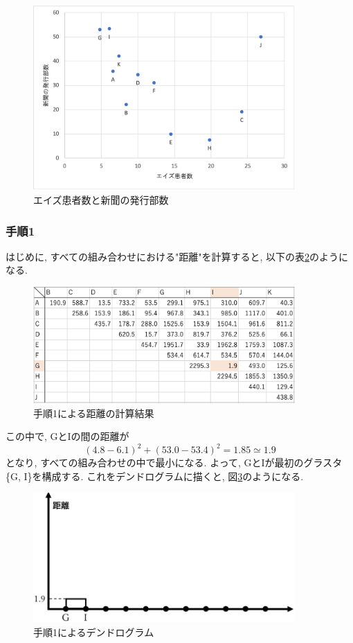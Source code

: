 \documentclass[a4paper,11pt,dvipdfmx]{jsarticle}
\makeatletter
\newcommand{\tblcaption}[1]{\def\@captype{table}\caption{#1}}
\makeatother
\begin{document}
\begin{figure}[htb]
  \centering
  \includegraphics[width=10cm]{../pics/aids.png}
  \caption{エイズ患者数と新聞の発行部数}
  \label{fig:aids_and_circulation}
\end{figure}

\subsubsection*{手順1}
はじめに, すべての組み合わせにおける"距離"を計算すると, 以下の表\ref{tab:initial_distance}のようになる. 

\begin{figure}[htb]
  \centering
  \tblcaption{手順1による距離の計算結果}
  \label{tab:initial_distance}
  \includegraphics[width=10cm]{../pics/tab1.png}
\end{figure}

この中で, GとIの間の距離が
\[
  (4.8-6.1)^2+(53.0-53.4)^2=1.85 \simeq 1.9
\]
となり, すべての組み合わせの中で最小になる. よって, GとIが最初のグラスタ\{G, I\}を構成する. これをデンドログラムに描くと, 図\ref{fig:dendro1}のようになる. 

\begin{figure}[htb]
  \centering
  \includegraphics[width=10cm]{../pics/dendro_1.png}
  \caption{手順1によるデンドログラム}
  \label{fig:dendro1}
\end{figure}
\end{document}

